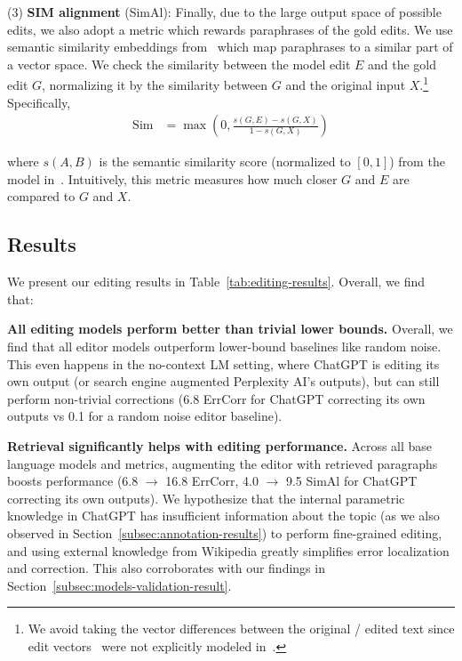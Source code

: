 \documentclass[11pt]{article}
\newcommand{\kalpesh}[1]{\textcolor{brown}{[Kalpesh: #1]}
}
\begin{document}
\noindent (3) \textbf{SIM alignment} (SimAl): Finally, due to the large output space of possible edits, we also adopt a metric which rewards paraphrases of the gold edits. We use semantic similarity embeddings from~\citet{wieting-etal-2022-paraphrastic} which map paraphrases to a similar part of a vector space. We check the similarity between the model edit $E$ and the gold edit $G$, normalizing it by the similarity between $G$ and the original input $X$.\footnote{We avoid taking the vector differences between the original / edited text since edit vectors~\citep{guu2018generating} were not explicitly modeled in~\citet{wieting-etal-2022-paraphrastic}.} Specifically,
\begin{align*}
    \text{Sim} &= \max\left(0, \frac{s(G, E) - s(G, X)}{1 - s(G, X)} \right)
\end{align*}

where $s(A,B)$ is the semantic similarity score (normalized to $[0, 1]$) from the model in~\citet{wieting-etal-2022-paraphrastic}. Intuitively, this metric measures how much closer $G$ and $E$ are compared to $G$ and $X$.


\subsection{Results}\label{subsubsec:editing-results}

We present our editing results in Table~\ref{tab:editing-results}. Overall, we find that:

\vspace{.3em}

\noindent \textbf{All editing models perform better than trivial lower bounds.} Overall, we find that all editor models outperform lower-bound baselines like random noise. This even happens in the no-context LM setting, where ChatGPT is editing its own output (or search engine augmented Perplexity AI's outputs), but can still perform non-trivial corrections (6.8 ErrCorr for ChatGPT correcting its own outputs vs 0.1 for a random noise editor baseline).


\vspace{.3em}

\noindent \textbf{Retrieval significantly helps with editing performance.} Across all base language models and metrics, augmenting the editor with retrieved paragraphs boosts performance (6.8 $\rightarrow$ 16.8 ErrCorr, 4.0 $\rightarrow$ 9.5 SimAl for ChatGPT correcting its own outputs). We hypothesize that the internal parametric knowledge in ChatGPT has insufficient information about the topic (as we also observed in Section~\ref{subsec:annotation-results}) to perform fine-grained editing, and using external knowledge from Wikipedia greatly simplifies error localization and correction. This also corroborates with our findings in Section~\ref{subsec:models-validation-result}.
\end{document}
